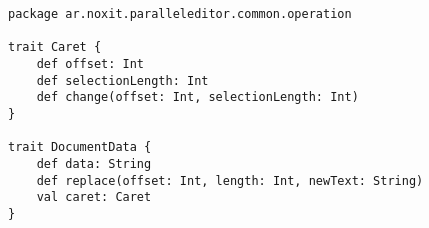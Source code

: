{
\tiny
\begin{verbatim}
package ar.noxit.paralleleditor.common.operation

trait Caret {
    def offset: Int
    def selectionLength: Int
    def change(offset: Int, selectionLength: Int)
}

trait DocumentData {
    def data: String
    def replace(offset: Int, length: Int, newText: String)
    val caret: Caret
}
\end{verbatim}
}